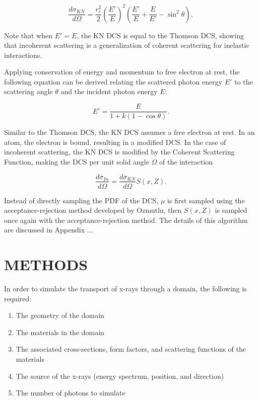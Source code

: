 \documentclass[%
 aip,
cp,  %
 amsmath,amssymb,%
reprint,%
]{revtex4-2}
\begin{document}
\begin{equation}
    \frac{d\sigma_{KN}}{d\Omega} = \frac{r_e^2}{2} \left(\frac{E'}{E}\right)^2 \left(\frac{E'}{E} + \frac{E}{E'} - \sin^2 \theta \right),
\end{equation}

\par Note that when $E' = E$, the KN DCS is equal to the Thomson DCS, showing that incoherent scattering is a generalization of coherent scattering for inelastic interactions. \\

\par Applying conservation of energy and momentum to free electron at rest, the following equation can be derived relating the scattered photon energy $E'$ to the scattering angle $\theta$ and the incident photon energy $E$:

\begin{equation}
    E' = \frac{E}{1 + k(1 - \cos \theta)}.
\end{equation}

\par Similar to the Thomson DCS, the KN DCS assumes a free electron at rest. In an atom, the electron is bound, resulting in a modified DCS. In the case of incoherent scattering, the KN DCS is modified by the Coherent Scattering Function, making the DCS per unit solid angle $\Omega$ of the interaction

\begin{equation}
    \frac{d\sigma_{In}}{d\Omega} = \frac{d\sigma_{KN}}{d\Omega} S(x, Z).
\end{equation}


Instead of directly sampling the PDF of the DCS, $\mu$ is first sampled using the acceptance-rejection method developed by Ozmutlu, then $S(x, Z)$ is sampled once again with the acceptance-rejection method. The details of this algorithm are discussed in Appendix ... \\




\section{METHODS}

In order to simulate the transport of x-rays through a domain, the following is required:

\begin{enumerate}
    \item The geometry of the domain
    \item The materials in the domain
    \item The associated cross-sections, form factors, and scattering functions of the materials
    \item The source of the x-rays (energy spectrum, position, and direction)
    \item The number of photons to simulate
\end{enumerate}
\end{document}

